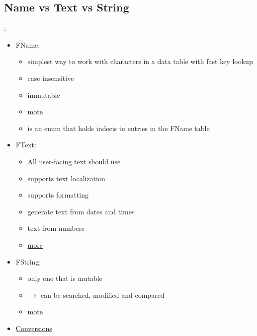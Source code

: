             \subsection{Name vs Text vs String}:
            \begin{itemize}
                \item FName: 
                \begin{itemize}
                    \item simplest way to work with characters in a data table with fast key lookup
                    \item case insensitive
                    \item immutable
                    \item \href{https://docs.unrealengine.com/en-US/ProgrammingAndScripting/ProgrammingWithCPP/UnrealArchitecture/StringHandling/FName/index.html}{more}
                    \item {} is an enum that holds indecis to entries in the FName table
                \end{itemize}
                \item FText:
                \begin{itemize}
                    \item All user-facing text should use
                    \item supports text localization
                    \item supports formatting
                    \item generate text from dates and times
                    \item text from numbers
                    \item \href{https://docs.unrealengine.com/en-US/ProgrammingAndScripting/ProgrammingWithCPP/UnrealArchitecture/StringHandling/FText/index.html}{more}
                \end{itemize}
                \item FString:
                \begin{itemize}
                    \item only one that is mutable
                    \item $\rightarrow$ can be searched, modified and compared
                    \item \href{https://docs.unrealengine.com/en-US/ProgrammingAndScripting/ProgrammingWithCPP/UnrealArchitecture/StringHandling/FString/index.html}{more}
                \end{itemize}
                \item \href{https://docs.unrealengine.com/en-US/ProgrammingAndScripting/ProgrammingWithCPP/UnrealArchitecture/StringHandling/index.html}{Conversions}
            \end{itemize}

